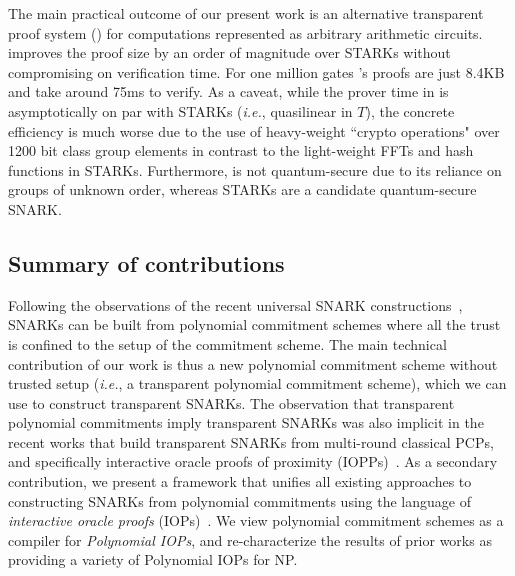 The main practical outcome of our present work is an alternative transparent proof system () for computations represented as arbitrary arithmetic circuits.  improves the proof size by an order of magnitude over STARKs without compromising on verification time. For one million gates 's proofs are just 8.4KB and take around 75ms to verify. 
As a caveat, while the prover time in  is asymptotically on par with STARKs (\emph{i.e.}, quasilinear in $T$), the concrete efficiency is much worse due to the use of heavy-weight ``crypto operations" over 1200 bit class group elements in contrast to the light-weight FFTs and hash functions in STARKs. Furthermore,  is not quantum-secure due to its reliance on groups of unknown order, whereas STARKs are a candidate quantum-secure SNARK. 

\subsection{Summary of contributions} 
Following the observations of the recent universal SNARK constructions~\cite{Plonk,Sonic,Libra}, SNARKs can be built from polynomial commitment schemes where all the trust is confined to the setup of the commitment scheme. The main technical contribution of our work is thus a new polynomial commitment scheme without trusted setup (\emph{i.e.}, a transparent polynomial commitment scheme), which we can use to construct transparent SNARKs. The observation that transparent polynomial commitments imply transparent SNARKs was also implicit in the recent works that build transparent SNARKs from multi-round classical PCPs, and specifically interactive oracle proofs of proximity (IOPPs)~\cite{ICALP:BBHR18}. As a secondary contribution, we present a framework that unifies all existing approaches to constructing SNARKs from polynomial commitments using the language of \emph{interactive oracle proofs} (IOPs)~\cite{STOC:ReiRotRot16,TCC:BenChiSpo16}. We view polynomial commitment schemes as a compiler for \emph{Polynomial IOPs}, and re-characterize the results of prior works as providing a variety of Polynomial IOPs for NP. 

